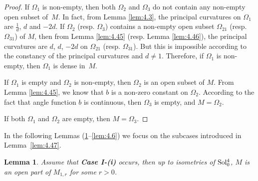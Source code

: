 \documentclass[reqno]{amsart}%
\newtheorem{lemma}[theorem]{Lemma}
\theoremstyle{definition}
\numberwithin{equation}{section}
\begin{document}
	\begin{proof}
		If $\Omega_1$ is non-empty, then both $\Omega_2$ and $\Omega_3$ do not
		contain any non-empty open subset of~$M$. In fact, from Lemma \ref{lem:4.3},
		the principal curvatures on $\Omega_1$ are $\tfrac{1}{d}$, $d$ and $-2d$.
		If $\Omega_2$ (resp. $\Omega_3$)
		contains a non-empty open subset $\Omega_{21}$ (resp. $\Omega_{31}$) of $M$, then from Lemma
		\ref{lem:4.45} (resp. Lemma \ref{lem:4.46}), the principal curvatures are $d$, $d$, $-2d$ on
		$\Omega_{21}$ (resp. $\Omega_{31}$).
		But this is impossible according to the constancy of the principal curvatures and $d\neq1$.
		Therefore, if $\Omega_1$ is non-empty, then $\Omega_1$ is dense in~$M$.
		
		If $\Omega_1$ is empty and $\Omega_2$ is non-empty, then $\Omega_2$ is an open subset of $M$.
		From Lemma \ref{lem:4.45}, we know that $b$ is a non-zero constant on $\Omega_2$.
		According to the fact that angle function $b$ is continuous, then
		$\Omega_3$ is empty, and $M=\Omega_2$.
		
		If both $\Omega_1$ and $\Omega_2$ are empty, then $M=\Omega_3$.
	\end{proof}
	
	In the following Lemmas (\ref{lem:4.4}--\ref{lem:4.6}) we focus on the subcases introduced in Lemma~\ref{lem:4.47}.
	\begin{lemma}\label{lem:4.4}
		Assume that {\bf Case I-(i)} occurs, then up to isometries of ${\rm Sol_0^4}$,
		$M$ is an open part of $M_{1,r}$ for some $r>0$.
	\end{lemma}
	
\end{document}
